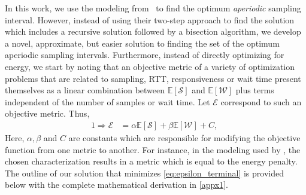 In this work, we use the modeling from~\cite{secAperiodic} to find the optimum \emph{aperiodic} sampling interval.
However, instead of using their two-step approach to find the solution which includes a recursive solution followed by a bisection algorithm, we develop a novel, approximate, but easier solution to finding the set of the optimum aperiodic sampling intervals.
Furthermore, instead of directly optimizing for energy, we start by noting that an objective metric of a variety of optimization problems that are related to sampling, RTT, responsiveness or wait time present themselves 
as a linear combination between $\mathbb{E}[\mathcal{S}]$ and $\mathbb{E}[\mathcal{W}]$ plus terms independent of the number of samples or wait time.
Let $\mathcal{E}$ correspond to such an objective metric.
Thus,
\begin{alignat}{1}
    \Rightarrow\mathcal{E}&=\alpha\mathbb{E}[\mathcal{S}]+\beta\mathbb{E}[\mathcal{W}]+C,\;\label{eq:epsilon_terminal}
\end{alignat}
Here, $\alpha, \beta$ and $C$ are constants which are responsible for modifying the objective function from one metric to another.
For instance, in the modeling used by \textcite{ICCperiodic1,TMCperiodic,secAperiodic}, the chosen characterization results in a metric which is equal to the energy penalty.
The outline of our solution that minimizes \cref{eq:epsilon_terminal} is provided below with the complete mathematical derivation in \cref{appx1}.

\bigskip

